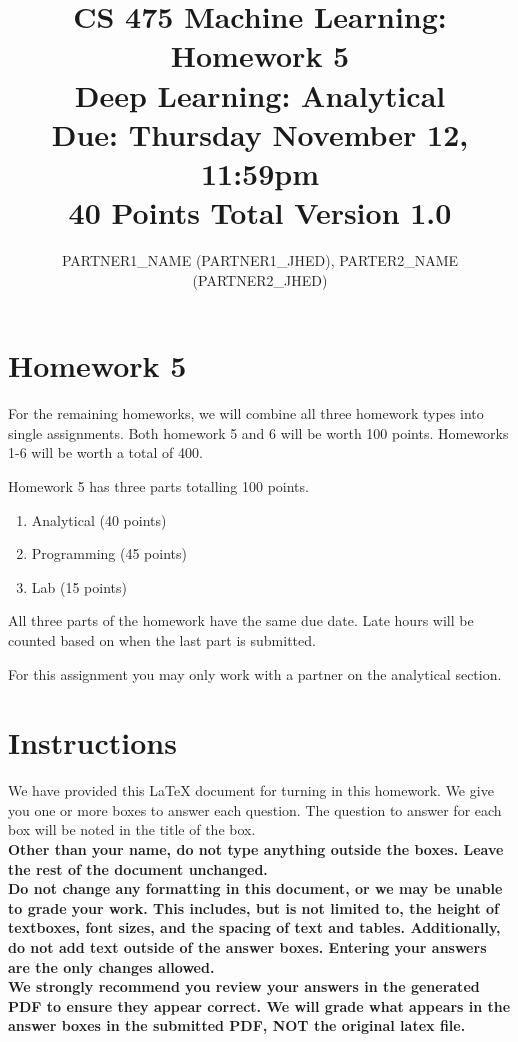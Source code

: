 \documentclass[11pt]{article}
\title{CS 475 Machine Learning: Homework 5\\
Deep Learning: Analytical\\
\Large{Due: Thursday November 12, 11:59pm}\\
40 Points Total \hspace{1cm} Version 1.0}
\author{PARTNER1\_NAME (PARTNER1\_JHED), PARTER2\_NAME (PARTNER2\_JHED)}
\date{}
\begin{document}
\maketitle
\thispagestyle{headings}

\section*{Homework 5}
For the remaining homeworks, we will combine all three homework types into single assignments. Both homework 5 and 6 will be worth 100 points. Homeworks 1-6 will be worth a total of 400.

Homework 5 has three parts totalling 100 points. 
\begin{enumerate}
    \item Analytical (40 points)
    \item Programming (45 points)
    \item Lab (15 points)
\end{enumerate}

All three parts of the homework have the same due date. Late hours will be counted based on when the last part is submitted. 

For this assignment you may only work with a partner on the analytical section.

\section*{Instructions }
We have provided this \LaTeX{} document for turning in this homework. We give you one or more boxes to answer each question.  The question to answer for each box will be noted in the title of the box.\\

{\bf Other than your name, do not type anything outside the boxes. Leave the rest of the document unchanged.}\\


\textbf{Do not change any formatting in this document, or we may be unable to
  grade your work. This includes, but is not limited to, the height of
  textboxes, font sizes, and the spacing of text and tables.  Additionally, do
  not add text outside of the answer boxes. Entering your answers are the only
  changes allowed.}\\


\textbf{We strongly recommend you review your answers in the generated PDF to
  ensure they appear correct. We will grade what appears in the answer boxes in
  the submitted PDF, NOT the original latex file.}
\end{document}
